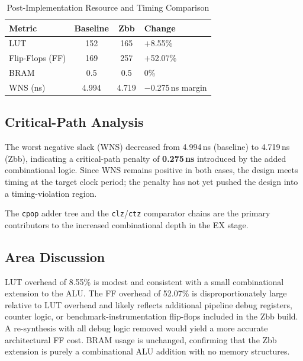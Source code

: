\documentclass[conference]{IEEEtran}
\begin{document}
	\begin{table}[h]
		\centering
		\caption{Post-Implementation Resource and Timing Comparison}
		\label{tab:area}
		\begin{tabular}{lccl}
			\toprule
			\textbf{Metric} & \textbf{Baseline} & \textbf{Zbb} & \textbf{Change} \\
			\midrule
			LUT              & 152  & 165  & $+$8.55\%            \\
			Flip-Flops (FF)  & 169  & 257  & $+$52.07\%           \\
			BRAM             & 0.5  & 0.5  & 0\%                  \\
			WNS (ns)         & 4.994 & 4.719 & $-$0.275\,ns margin \\
			\bottomrule
		\end{tabular}
	\end{table}
	
	\subsection{Critical-Path Analysis}
	
	The worst negative slack (WNS) decreased from 4.994\,ns (baseline) to
	4.719\,ns (Zbb), indicating a critical-path penalty of \textbf{0.275\,ns}
	introduced by the added combinational logic.
	Since WNS remains positive in both cases, the design meets timing at the
	target clock period; the penalty has not yet pushed the design into a
	timing-violation region.
	
	The \texttt{cpop} adder tree and the \texttt{clz}/\texttt{ctz} comparator
	chains are the primary contributors to the increased combinational depth in
	the EX stage.
	
	\subsection{Area Discussion}
	
	LUT overhead of 8.55\% is modest and consistent with a small combinational
	extension to the ALU.
	The FF overhead of 52.07\% is disproportionately large relative to LUT
	overhead and likely reflects additional pipeline debug registers, counter
	logic, or benchmark-instrumentation flip-flops included in the Zbb build.
	A re-synthesis with all debug logic removed would yield a more accurate
	architectural FF cost.
	BRAM usage is unchanged, confirming that the Zbb extension is purely a
	combinational ALU addition with no memory structures.
	
\end{document}
